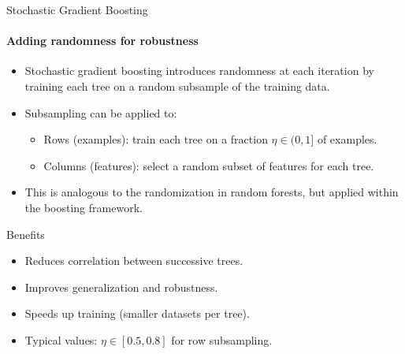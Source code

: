 \begin{frame}{Stochastic Gradient Boosting}
  \framesubtitle{Adding randomness for robustness}
  \begin{itemize}
    \item \alert{Stochastic gradient boosting} introduces randomness at each iteration by
          training each tree on a \alert{random subsample} of the training data.
    \item Subsampling can be applied to:
      \begin{itemize}
        \item \alert{Rows (examples)}: train each tree on a fraction $\eta \in (0, 1]$ of examples.
        \item \alert{Columns (features)}: select a random subset of features for each tree.
      \end{itemize}
    \item This is analogous to the randomization in random forests, but applied within the
          boosting framework.
  \end{itemize}
  \begin{block}{Benefits}
    \begin{itemize}
      \item Reduces correlation between successive trees.
      \item Improves generalization and robustness.
      \item Speeds up training (smaller datasets per tree).
    \end{itemize}
  \end{block}
  \begin{itemize}
    \item Typical values: $\eta \in [0.5, 0.8]$ for row subsampling.
  \end{itemize}
\end{frame}

